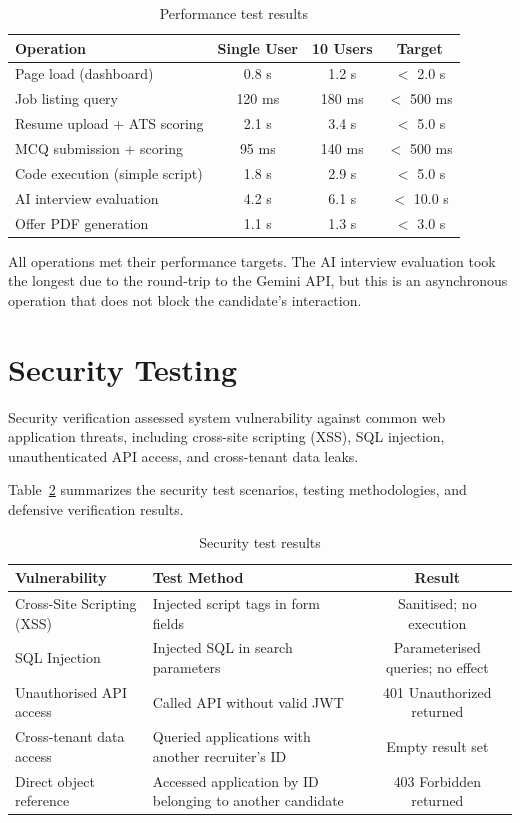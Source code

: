 \begin{table}[H]
\centering
\caption{Performance test results}
\label{tab:perf-tests}
\small
\begin{tabularx}{\textwidth}{X c c c}
\toprule
\textbf{Operation} & \textbf{Single User} & \textbf{10 Users} & \textbf{Target} \\
\midrule
Page load (dashboard)          & 0.8 s  & 1.2 s  & $<$ 2.0 s \\
Job listing query              & 120 ms & 180 ms & $<$ 500 ms \\
Resume upload + ATS scoring    & 2.1 s  & 3.4 s  & $<$ 5.0 s \\
MCQ submission + scoring       & 95 ms  & 140 ms & $<$ 500 ms \\
Code execution (simple script) & 1.8 s  & 2.9 s  & $<$ 5.0 s \\
AI interview evaluation        & 4.2 s  & 6.1 s  & $<$ 10.0 s \\
Offer PDF generation           & 1.1 s  & 1.3 s  & $<$ 3.0 s \\
\bottomrule
\end{tabularx}
\end{table}

All operations met their performance targets. The AI interview evaluation took the longest due to the round-trip to the Gemini API, but this is an asynchronous operation that does not block the candidate's interaction.

\section{Security Testing}
\label{sec:security-tests}

Security verification assessed system vulnerability against common web application threats, including cross-site scripting (XSS), SQL injection, unauthenticated API access, and cross-tenant data leaks.

Table~\ref{tab:security-tests} summarizes the security test scenarios, testing methodologies, and defensive verification results.

\begin{table}[H]
\centering
\caption{Security test results}
\label{tab:security-tests}
\small
\begin{tabularx}{\textwidth}{X X c}
\toprule
\textbf{Vulnerability} & \textbf{Test Method} & \textbf{Result} \\
\midrule
Cross-Site Scripting (XSS) & Injected script tags in form fields & Sanitised; no execution \\
SQL Injection & Injected SQL in search parameters & Parameterised queries; no effect \\
Unauthorised API access & Called API without valid JWT & 401 Unauthorized returned \\
Cross-tenant data access & Queried applications with another recruiter's ID & Empty result set \\
Direct object reference & Accessed application by ID belonging to another candidate & 403 Forbidden returned \\
\bottomrule
\end{tabularx}
\end{table}

